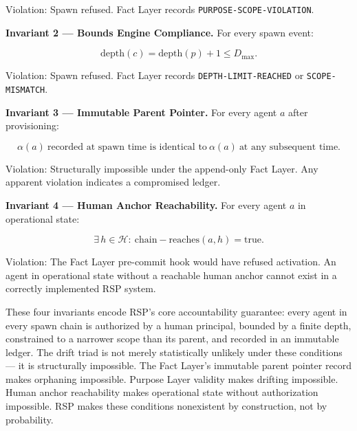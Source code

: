 Violation: Spawn refused. Fact Layer records \texttt{PURPOSE-SCOPE-VIOLATION}.

\bigskip
\noindent\textbf{Invariant 2 — Bounds Engine Compliance.} For every spawn event:

\begin{equation}
\mathrm{depth}(c) = \mathrm{depth}(p) + 1 \leq D_{\max}.
\label{eq:rs-inv-bounds-compliance}
\end{equation}

Violation: Spawn refused. Fact Layer records \texttt{DEPTH-LIMIT-REACHED} or \texttt{SCOPE-MISMATCH}.

\bigskip
\noindent\textbf{Invariant 3 — Immutable Parent Pointer.} For every agent $a$ after provisioning:

\begin{equation}
\alpha(a)\ \text{recorded at spawn time is identical to}\ \alpha(a)\ \text{at any subsequent time}.
\label{eq:rs-inv-immutable-parent}
\end{equation}

Violation: Structurally impossible under the append-only Fact Layer. Any apparent violation indicates a compromised ledger.

\bigskip
\noindent\textbf{Invariant 4 — Human Anchor Reachability.} For every agent $a$ in operational state:

\begin{equation}
\exists\, h \in \mathcal{H}:\ \mathrm{chain-reaches}(a, h) = \mathrm{true}.
\label{eq:rs-inv-human-anchor}
\end{equation}

Violation: The Fact Layer pre-commit hook would have refused activation. An agent in operational state without a reachable human anchor cannot exist in a correctly implemented RSP system.

\bigskip
These four invariants encode RSP's core accountability guarantee: every agent in every spawn chain is authorized by a human principal, bounded by a finite depth, constrained to a narrower scope than its parent, and recorded in an immutable ledger. The drift triad is not merely statistically unlikely under these conditions — it is structurally impossible. The Fact Layer's immutable parent pointer record makes orphaning impossible. Purpose Layer validity makes drifting impossible. Human anchor reachability makes operational state without authorization impossible. RSP makes these conditions nonexistent by construction, not by probability.
